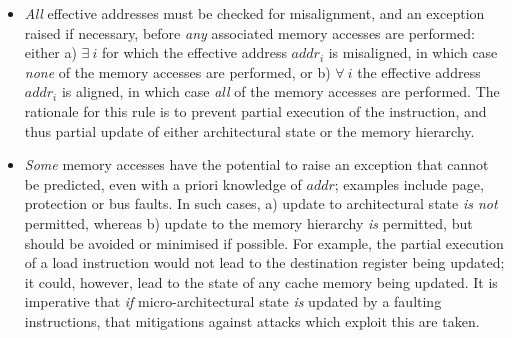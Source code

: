 \begin{itemize}

\item {\em All} effective addresses must be checked for misalignment, and
      an exception raised if necessary, before {\em any} associated memory 
      accesses are performed: either
      a) $\exists~i$ for which the effective address $addr_i$ is misaligned, 
         in which case {\em none} of the memory accesses are performed,
         or
      b) $\forall~i$           the effective address $addr_i$ is    aligned, 
         in which case {\em  all} of the memory accesses are performed.
      The rationale for this rule is to prevent partial execution of the
      instruction, and thus partial update of either architectural state
      or the memory hierarchy.

\item {\em Some} memory accesses have the potential to raise an exception
      that cannot be predicted, even with a priori knowledge of $addr$;
      examples include page, protection or bus faults.  In such cases,
      a) update to 
         architectural state 
         {\em is not} permitted,
         whereas
      b) update to the 
         memory hierarchy
         {\em is}     permitted,
         but should be avoided or minimised if possible.
      For example, the partial execution of a load instruction would not
      lead to the destination register being updated; it could, however,
      lead to the state of any cache memory being updated.
      It is imperative that {\em if} micro-architectural state {\em is}
      updated by a faulting instructions, that mitigations against
      attacks which exploit this are taken.

\end{itemize}


